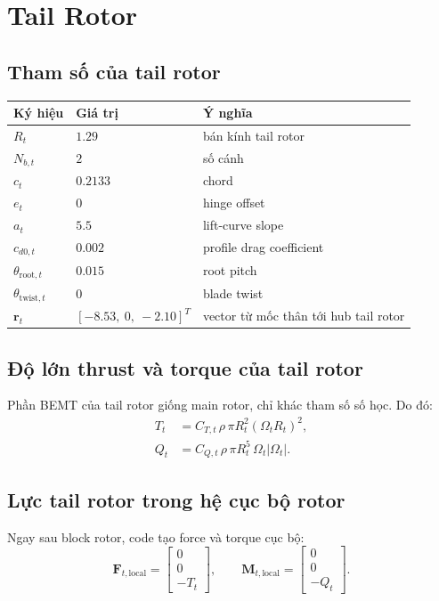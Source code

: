 \documentclass[11pt,a4paper]{article}
\newcommand{\vect}[1]{\boldsymbol{#1}}
\begin{document}
\section{Tail Rotor}

\subsection{Tham số của tail rotor}

\begin{center}
\begin{tabular}{@{}lll@{}}
\toprule
Ký hiệu & Giá trị & Ý nghĩa \\
\midrule
\(R_t\) & \(1.29\) & bán kính tail rotor \\
\(N_{b,t}\) & \(2\) & số cánh \\
\(c_t\) & \(0.2133\) & chord \\
\(e_t\) & \(0\) & hinge offset \\
\(a_t\) & \(5.5\) & lift-curve slope \\
\(c_{d0,t}\) & \(0.002\) & profile drag coefficient \\
\(\theta_{\mathrm{root},t}\) & \(0.015\) & root pitch \\
\(\theta_{\mathrm{twist},t}\) & \(0\) & blade twist \\
\(\vect{r}_t\) & \([ -8.53,\ 0,\ -2.10]^T\) & vector từ mốc thân tới hub tail rotor \\
\bottomrule
\end{tabular}
\end{center}

\subsection{Độ lớn thrust và torque của tail rotor}

Phần BEMT của tail rotor giống main rotor, chỉ khác tham số số học.
Do đó:
\begin{align}
  T_t &= C_{T,t}\,\rho\,\pi R_t^2(\Omega_t R_t)^2, \\
  Q_t &= C_{Q,t}\,\rho\,\pi R_t^5\,\Omega_t |\Omega_t|.
\end{align}

\subsection{Lực tail rotor trong hệ cục bộ rotor}

Ngay sau block rotor, code tạo force và torque cục bộ:
\begin{equation}
  \vect{F}_{t,\mathrm{local}}
  =
  \begin{bmatrix}
    0 \\ 0 \\ -T_t
  \end{bmatrix},
  \qquad
  \vect{M}_{t,\mathrm{local}}
  =
  \begin{bmatrix}
    0 \\ 0 \\ -Q_t
  \end{bmatrix}.
\end{equation}
\end{document}
